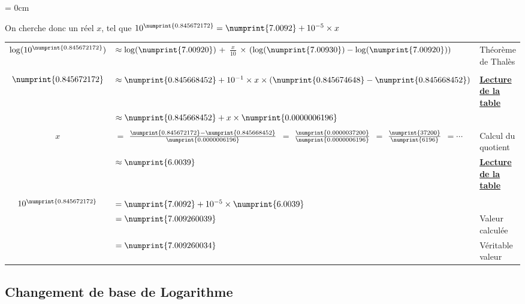 \documentclass[a4paper, twoside]{article}
\begin{document}
	{\parindent = 0cm

	On cherche donc un réel $x$, tel que $10^{\numprint{0.845 672 172}} = \numprint{7.0092} + 10^{-5} \times x$

	\vspace{3 mm}

	\begin{small}
	\begin{tabular}{cl|l}
	$\log (10^{\numprint{0.845 672 172}}) $ & $\approx \log ( \numprint{7.00920} ) ~ + $ {\large$\frac{x}{10}$} $ \times ~ ( \log ( \numprint{7.00930} ) - \log ( \numprint{7.00920} ) )$ & Théorème de Thalès\\

	&& \\

	$\numprint{0.845 672 172}$	 & $\approx \numprint{0.845 668 452} + 10^{-1} \times x \times (\numprint{0.845 674 648} - \numprint{0.845 668 452} )$ & \underline{\textbf{Lecture de la table}}\\

								& $\approx \numprint{0.845 668 452} + x \times \numprint{0.000 000 619 6}$ & \\
								
	&& \\

	$x$&$=$ {\normalsize$\frac{\numprint{0.845 672 172} -  \numprint{0.845 668 452}} {\numprint{0.000 000 619 6}} $} $=$ {\normalsize$\frac{\numprint{0.000 003 720 0}} {\numprint{0.000 000 619 6}} $} $=$ {\normalsize$\frac{\numprint{3 7200}} {\numprint{619 6}} $} $= \cdots$  & Calcul du quotient \\
								
								& $\approx \numprint{6.0039}$ & \underline{\textbf{Lecture de la table}}\\
								
	&& \\
								
	$10^{\numprint{0.845 672 172}}$ & $= \numprint{7.0092} + 10^{-5} \times \numprint{6.0039}$ & \\
									& $= \numprint{7.009 260 039}$ & Valeur calculée\\
									& $= \numprint{7.009 260 034}$ & Véritable valeur\\
	\end{tabular}
	\end{small}

	}

	\newpage

	\subsection{Changement de base de Logarithme}
\end{document}
